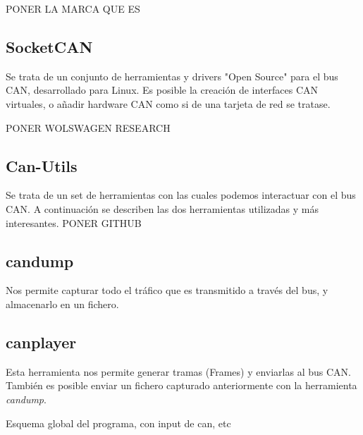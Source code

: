 PONER LA MARCA QUE ES

\subsection{SocketCAN}\label{socketcan}

Se trata de un conjunto de herramientas y drivers "Open Source" para el bus CAN, desarrollado para Linux. Es posible la creación de interfaces CAN virtuales, o añadir hardware CAN como si de una tarjeta de red se tratase.

PONER WOLSWAGEN RESEARCH

\subsection{Can-Utils}\label{can-utils}

Se trata de un set de herramientas con las cuales podemos interactuar con el bus CAN. A continuación se describen las dos herramientas utilizadas y más interesantes.
PONER GITHUB

\subsection{candump}\label{candump}

Nos permite capturar todo el tráfico que es transmitido a través del bus, y almacenarlo en un fichero.

\subsection{canplayer}\label{canplayer}

Esta herramienta nos permite generar tramas (Frames) y enviarlas al bus CAN. También es posible enviar un fichero capturado anteriormente con la herramienta \emph{candump}.





Esquema global del programa, con input de can, etc


